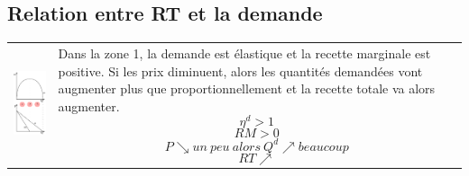 \subsection{Relation entre RT et la demande}
\begin{center}
	\begin{tabular}{cp{}}
		\begin{minipage}{.3\textwidth}
		\includegraphics[width=\textwidth]{images/graph_relation_entre_rt_et_demande.pdf}
		\end{minipage}
		&
		Dans la zone 1, la demande est \textcolor[rgb]{1,0,0}{élastique} et la recette marginale est \textcolor[rgb]{1,0,0}{positive}.
		Si les prix diminuent, alors les quantités demandées vont \textcolor[rgb]{1,0,0}{augmenter plus} que proportionnellement et la recette totale va alors \textcolor[rgb]{1,0,0}{augmenter}.
		$$\eta^d > 1$$
		$$RM > 0$$
		$$P \searrow un\ peu\ alors\ Q^d \nearrow beaucoup$$
		$$RT \nearrow$$


\end{tabular}
\end{center}
